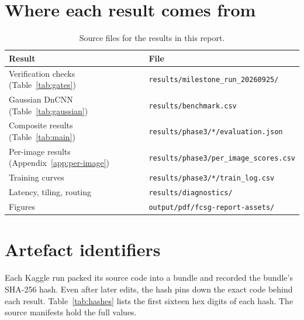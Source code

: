 \documentclass[12pt,a4paper,oneside]{NITR}
\begin{document}
\section{Where each result comes from}

\begin{table}[htbp]
	\centering
	\caption{Source files for the results in this report.}
	\label{tab:sources}
	\small
	\begin{tabular}{@{}ll@{}}
		\toprule
		Result & File \\
		\midrule
		Verification checks (Table~\ref{tab:gates}) & \texttt{results/milestone\_run\_20260925/} \\
		Gaussian DnCNN (Table~\ref{tab:gaussian})   & \texttt{results/benchmark.csv} \\
		Composite results (Table~\ref{tab:main})     & \texttt{results/phase3/*/evaluation.json} \\
		Per-image results (Appendix~\ref{app:per-image}) & \texttt{results/phase3/per\_image\_scores.csv} \\
		Training curves                              & \texttt{results/phase3/*/train\_log.csv} \\
		Latency, tiling, routing                     & \texttt{results/diagnostics/} \\
		Figures                                      & \texttt{output/pdf/fcsg-report-assets/} \\
		\bottomrule
	\end{tabular}
\end{table}

\section{Artefact identifiers}

Each Kaggle run packed its source code into a bundle and recorded the
bundle's SHA-256 hash. Even after later edits, the hash pins down the exact
code behind each result. Table~\ref{tab:hashes} lists the first sixteen hex
digits of each hash. The source manifests hold the full values.
\end{document}
